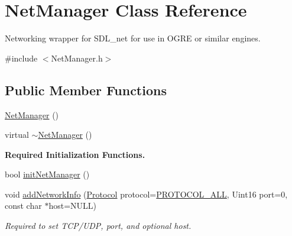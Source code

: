 \hypertarget{classNetManager}{\section{Net\-Manager Class Reference}
\label{classNetManager}
}


Networking wrapper for S\-D\-L\-\_\-net for use in O\-G\-R\-E or similar engines.  




{\ttfamily \#include $<$Net\-Manager.\-h$>$}

\subsection*{Public Member Functions}
\begin{DoxyCompactItemize}
\item 
\hyperlink{classNetManager_ac5af765a0303c73966c2e0743458f888}{Net\-Manager} ()
\item 
virtual \hyperlink{classNetManager_a862eebc070ee07d7a9e18f62da051604}{$\sim$\-Net\-Manager} ()
\end{DoxyCompactItemize}
\begin{Indent}{\bf Required Initialization Functions.}\par
\begin{DoxyCompactItemize}
\item 
bool \hyperlink{classNetManager_a9dcef281247169fc624d771f2a4ae01a}{init\-Net\-Manager} ()
\item 
void \hyperlink{classNetManager_a8ec0340fa0eeffc5f4344589069e6058}{add\-Network\-Info} (\hyperlink{NetManager_8h_a9af285d1232beed01f31aac5d3a5469f}{Protocol} protocol=\hyperlink{NetManager_8h_a06fc87d81c62e9abb8790b6e5713c55ba78c8c360e9d58fb53829c58ac0ae6a43}{P\-R\-O\-T\-O\-C\-O\-L\-\_\-\-A\-L\-L}, Uint16 port=0, const char $\ast$host=N\-U\-L\-L)
\begin{DoxyCompactList}\small\item\em Required to set T\-C\-P/\-U\-D\-P, port, and optional host. \end{DoxyCompactList}\end{DoxyCompactItemize}
\end{Indent}
